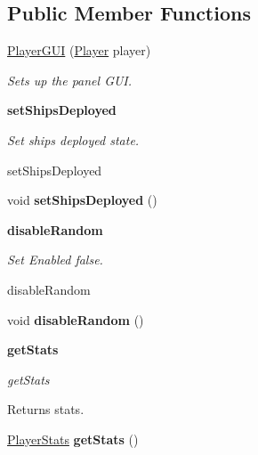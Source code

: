 \subsection*{Public Member Functions}
\begin{DoxyCompactItemize}
\item 
\hyperlink{classbattleship_1_1screen_1_1PlayerGUI_a1f0156d3983c57a361e85b183717b954}{Player\+G\+U\+I} (\hyperlink{classbattleship_1_1game_1_1Player}{Player} player)
\begin{DoxyCompactList}\small\item\em Sets up the panel G\+U\+I. \end{DoxyCompactList}\end{DoxyCompactItemize}
\begin{Indent}{\bf set\+Ships\+Deployed}\par
{\em Set ships deployed state.

set\+Ships\+Deployed }\begin{DoxyCompactItemize}
\item 
\hypertarget{classbattleship_1_1screen_1_1PlayerGUI_a9e512ea3346969bf55ec4d5073a2db02}{}void {\bfseries set\+Ships\+Deployed} ()\label{classbattleship_1_1screen_1_1PlayerGUI_a9e512ea3346969bf55ec4d5073a2db02}

\end{DoxyCompactItemize}
\end{Indent}
\begin{Indent}{\bf disable\+Random}\par
{\em Set Enabled false.

disable\+Random }\begin{DoxyCompactItemize}
\item 
\hypertarget{classbattleship_1_1screen_1_1PlayerGUI_a776f31a0c1da7ba357b7b8afedd3f9b4}{}void {\bfseries disable\+Random} ()\label{classbattleship_1_1screen_1_1PlayerGUI_a776f31a0c1da7ba357b7b8afedd3f9b4}

\end{DoxyCompactItemize}
\end{Indent}
\begin{Indent}{\bf get\+Stats}\par
{\em get\+Stats

\begin{DoxyReturn}{Returns}
stats. 
\end{DoxyReturn}
}\begin{DoxyCompactItemize}
\item 
\hypertarget{classbattleship_1_1screen_1_1PlayerGUI_ae6cc7c92fe3275462302d01a853e955b}{}\hyperlink{classbattleship_1_1screen_1_1PlayerStats}{Player\+Stats} {\bfseries get\+Stats} ()\label{classbattleship_1_1screen_1_1PlayerGUI_ae6cc7c92fe3275462302d01a853e955b}

\end{DoxyCompactItemize}
\end{Indent}


